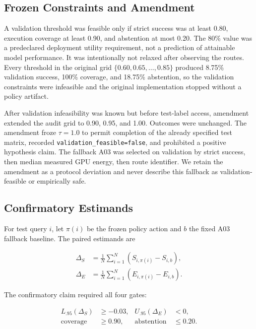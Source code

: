 \subsection{Frozen Constraints and Amendment}
\label{sec:amendment}

A validation threshold was feasible only if strict success was at least 0.80,
execution coverage at least 0.90, and abstention at most 0.20. The 80\% value was a
predeclared deployment utility requirement, not a prediction of attainable model
performance. It was intentionally not relaxed after observing the routes. Every
threshold in the original grid $\{0.60,0.65,\ldots,0.85\}$ produced 8.75\%
validation success, 100\% coverage, and 18.75\% abstention, so the validation
constraints were infeasible and the original implementation stopped without a
policy artifact.

After validation infeasibility was known but before test-label access, amendment
 extended the audit grid to
0.90, 0.95, and 1.00. Outcomes were unchanged. The amendment froze $\tau=1.0$ to
permit completion of the already specified test matrix, recorded
\texttt{validation\_feasible=false}, and prohibited a positive hypothesis claim.
The fallback A03 was selected on validation by strict success, then median measured
GPU energy, then route identifier. We retain the amendment as a protocol deviation
and never describe this fallback as validation-feasible or empirically safe.

\subsection{Confirmatory Estimands}

For test query $i$, let $\pi(i)$ be the frozen policy action and $b$ the fixed A03
fallback baseline. The paired estimands are

\begin{align}
\Delta_S &= \frac{1}{N}\sum_{i=1}^{N}
\left(S_{i,\pi(i)}-S_{i,b}\right), \\
\Delta_E &= \frac{1}{N}\sum_{i=1}^{N}
\left(E_{i,\pi(i)}-E_{i,b}\right).
\end{align}

The confirmatory claim required all four gates:

\begin{equation}
\begin{aligned}
L_{.95}(\Delta_S)&\geq-0.03, & U_{.95}(\Delta_E)&<0, \\
\mathrm{coverage}&\geq0.90, & \mathrm{abstention}&\leq0.20.
\end{aligned}
\label{eq:gates}
\end{equation}

